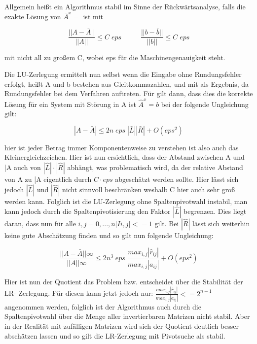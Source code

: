 \documentclass[course=erap]{aspdoc}
\begin{document}
Allgemein heißt ein Algorithmus stabil im Sinne der Rückwärtsanalyse, 
falls  die exakte Lösung von $\bar{A}^x =$ ist mit 							%

 \begin{equation}
\label{norm}
\frac{|| A - \bar{A}||}{||A||} \leq C \; eps \;\; \;\;\;\;\;\;\;\;  \frac{|| b - \bar{b}||}{||b||} \leq C \; eps
\end{equation}

 mit nicht all zu großem C, wobei eps für die Maschinengenauigkeit steht.

Die LU-Zerlegung ermittelt nun selbst wenn die Eingabe ohne 
Rundungsfehler erfolgt, heißt A und b bestehen aus Gleitkommazahlen,  und  mit 
 als Ergebnis, da Rundungsfehler bei dem Verfahren auftreten. Für  gilt 
dann, dass dies die korrekte Lösung für ein System mit Störung in A ist $\hat{A}^x=b$ bei der 
folgende Ungleichung gilt:

 \begin{equation}
\label{eg3}
|A - \bar{A}| \leq 2n \; eps \; |\bar{L}||\bar{R}| + O(eps^2)
\end{equation}

hier ist jeder Betrag immer Komponentenweise zu verstehen ist also auch das Kleinergleichzeichen.										%
Hier ist nun ersichtlich, dass der Abstand zwischen A und \bar{A} auch von $|\hat{L}| \cdot |\hat{R}|$
abhängt, was problematisch wird, da der relative Abstand von A zu \bar{A} eigentlich durch 
$C\cdot eps$ abgeschätzt werden sollte. Hier lässt sich jedoch $|\hat{L}|$ und $|\hat{R}|$ nicht sinnvoll 
beschränken weshalb C hier auch sehr groß werden kann.
Folglich ist die LU-Zerlegung ohne Spaltenpivotwahl instabil, man kann jedoch durch die Spaltenpivotisierung 
den Faktor $|\hat{L}|$  begrenzen. Dies liegt daran, dass nun für alle $i,j = 0,...,n |Ii,j| <= 1$ gilt. 
Bei $|\hat{R}|$ lässt sich weiterhin keine gute Abschätzung finden und so gilt nun folgende Ungleichung:  

 \begin{equation}
\label{eg3}
\frac{||A - \bar{A}||\infty}{||A||\infty} \leq 2n^3 \; eps \;\frac{max_{i,j}| \hat{r}_{ij}|}{max_{i,j}|a_{ij}|} + O(eps^2)
\end{equation}


Hier ist nun der Quotient das Problem bzw. entscheidet über die Stabilität der LR-
Zerlegung. Für diesen kann jetzt jedoch nur: $\frac{max_{i,j}| \hat{r}_{ij}|}{max_{i,j}|a_{ij}|} <= 2^{n-1}$ angenommen 
werden, folglich ist der Algorithmus auch durch die Spaltenpivotwahl über die Menge 
aller invertierbaren Matrizen nicht stabil. Aber in der Realität mit zufälligen Matrizen wird 
sich der Quotient deutlich besser abschätzen lassen und so gilt die LR-Zerlegung mit Pivotsuche als stabil.
\end{document}
